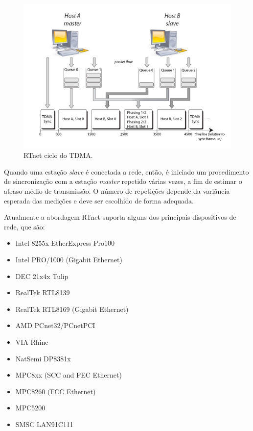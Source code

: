 \documentclass[conference]{IEEEtran}
\begin{document}
\begin{figure}[h]
	\centering
	\includegraphics[scale=0.33]{files/rtnet_tdma.png}
	\caption{RTnet ciclo do TDMA.  \cite{rtnet_org}}
	\label{fig:rtnet_tdma}
\end{figure}

Quando uma estação \textit{slave} é conectada a rede, então, é iniciado um procedimento de sincronização com a estação \textit{master} repetido várias vezes, a fim de estimar o atraso médio de transmissão. O número de repetições depende da variância esperada das medições e deve ser escolhido de forma adequada.

Atualmente a abordagem RTnet suporta alguns dos principais dispositivos de rede, que são:
\begin{itemize}
	\item Intel 8255x EtherExpress Pro100
	\item Intel PRO/1000 (Gigabit Ethernet)
	\item DEC 21x4x Tulip
	\item RealTek RTL8139
	\item RealTek RTL8169 (Gigabit Ethernet)
	\item AMD PCnet32/PCnetPCI
	\item VIA Rhine
	\item NatSemi DP8381x
	\item MPC8xx (SCC and FEC Ethernet)
	\item MPC8260 (FCC Ethernet)
	\item MPC5200
	\item SMSC LAN91C111
\end{itemize}
\end{document}

